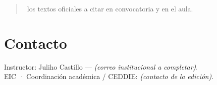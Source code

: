 \begin{quote}
\ceddie\ los textos oficiales a citar en convocatoria y en el aula.
\end{quote}

\section{Contacto}

Instructor: Juliho Castillo --- \textit{(correo institucional a completar)}.\\
EIC · Coordinación académica / CEDDIE: \textit{(contacto de la edición)}.
